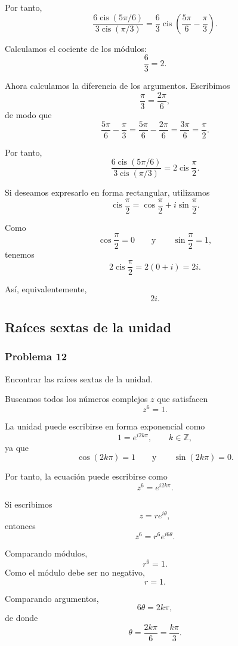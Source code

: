 \documentclass[12pt]{article}
\begin{document}
Por tanto,
\[
\frac{6\operatorname{cis}(5\pi/6)}
     {3\operatorname{cis}(\pi/3)}
=
\frac63
\operatorname{cis}\left(
\frac{5\pi}{6}-\frac{\pi}{3}
\right).
\]

Calculamos el cociente de los módulos:
\[
\frac63=2.
\]

Ahora calculamos la diferencia de los argumentos. Escribimos
\[
\frac{\pi}{3}=\frac{2\pi}{6},
\]
de modo que
\[
\frac{5\pi}{6}-\frac{\pi}{3}
=
\frac{5\pi}{6}-\frac{2\pi}{6}
=
\frac{3\pi}{6}
=
\frac{\pi}{2}.
\]

Por tanto,
\[
\boxed{
\frac{6\operatorname{cis}(5\pi/6)}
     {3\operatorname{cis}(\pi/3)}
=
2\operatorname{cis}\frac{\pi}{2}
}.
\]

Si deseamos expresarlo en forma rectangular, utilizamos
\[
\operatorname{cis}\frac{\pi}{2}
=
\cos\frac{\pi}{2}
+i\sin\frac{\pi}{2}.
\]

Como
\[
\cos\frac{\pi}{2}=0
\qquad\text{y}\qquad
\sin\frac{\pi}{2}=1,
\]
tenemos
\[
2\operatorname{cis}\frac{\pi}{2}
=
2(0+i)
=
2i.
\]

Así, equivalentemente,
\[
\boxed{2i}.
\]

\subsection{Raíces sextas de la unidad}

\subsubsection*{Problema 12}

Encontrar las raíces sextas de la unidad.

Buscamos todos los números complejos $z$ que satisfacen
\[
z^6=1.
\]

La unidad puede escribirse en forma exponencial como
\[
1=e^{i2k\pi},
\qquad
k\in\mathbb Z,
\]
ya que
\[
\cos(2k\pi)=1
\qquad\text{y}\qquad
\sin(2k\pi)=0.
\]

Por tanto, la ecuación puede escribirse como
\[
z^6=e^{i2k\pi}.
\]

Si escribimos
\[
z=re^{i\theta},
\]
entonces
\[
z^6=r^6e^{i6\theta}.
\]

Comparando módulos,
\[
r^6=1.
\]
Como el módulo debe ser no negativo,
\[
r=1.
\]

Comparando argumentos,
\[
6\theta=2k\pi,
\]
de donde
\[
\theta=\frac{2k\pi}{6}
=
\frac{k\pi}{3}.
\]
\end{document}
